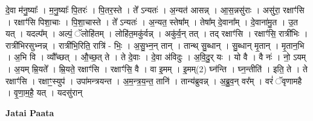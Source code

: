 \documentclass[17pt]{extarticle}
\begin{document}
दे॒वा म॑नु॒ष्याः᳚ । म॒नु॒ष्याः᳚ पि॒तरः॑ । पि॒तर॒स्ते । ते᳚ ऽन्यतः॑ । अ॒न्यत॑ आसन्न् । आ॒स॒न्नसु॑राः । असु॑रा॒ रक्षाꣳ॑सि । रक्षाꣳ॑सि पिशा॒चाः । पि॒शा॒चास्ते । ते᳚ ऽन्यतः॑ । अ॒न्यत॒ स्तेषा᳚म् । तेषा᳚म् दे॒वाना᳚म् । दे॒वाना॑मु॒त । उ॒त यत् । यदल्प᳚म् । अल्पं॒ ॅलोहि॑तम् । लोहि॑त॒मकु॑र्वन्न् । अकु॑र्व॒न् तत् । तद् रक्षाꣳ॑सि । रक्षाꣳ॑सि॒ रात्री॑भिः । रात्री॑भिरसुभ्नन्न् । रात्री॑भि॒रिति॒ रात्रि॑ - भिः॒ । अ॒सु॒भ्न॒न् तान् । तान्थ् सु॒ब्धान् । सु॒ब्धान् मृ॒तान् । मृ॒तान॒भि । 
अ॒भि वि । व्यौ᳚च्छत् । औ॒च्छ॒त् ते । ते दे॒वाः । दे॒वा अ॑विदुः । अ॒वि॒दु॒र् यः । यो वै । वै नः॑ । नो॒ ऽयम् । अ॒यम् म्रि॒यते᳚ । म्रि॒यते॒ रक्षाꣳ॑सि । रक्षाꣳ॑सि॒ वै । वा इ॒मम् । इ॒मम्(2) घ्न॑न्ति । घ्न॒न्तीति॑ । इति॒ ते । ते रक्षाꣳ॑सि । रक्षाꣳ॒॒स्युप॑ । उपा॑मन्त्रयन्त । अ॒म॒न्त्र॒य॒न्त॒ तानि॑ । तान्य॑ब्रुवन्न् । अ॒ब्रु॒व॒न् वर᳚म् । वरं॑ ॅवृणामहै । वृ॒णा॒म॒है॒ यत् । यदसु॑रान् \newline

\textbf{Jatai Paata} \newline
\end{document}
